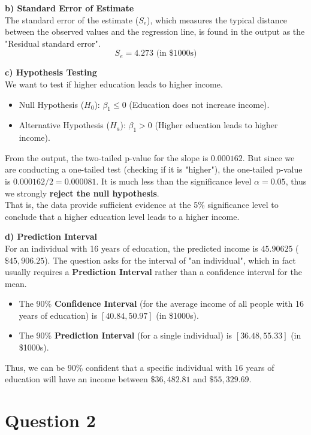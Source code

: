 \documentclass[11pt, a4paper]{article}
\begin{document}
\textbf{b) Standard Error of Estimate}\\
The standard error of the estimate ($S_e$), which measures the typical distance between the observed values and the regression line, is found in the output as the "Residual standard error". 
\[ S_e = 4.273 \text{ (in \$1000s)} \]

\textbf{c) Hypothesis Testing}\\
We want to test if higher education leads to higher income. 
\begin{itemize}
    \item Null Hypothesis ($H_0$): $\beta_1 \le 0$ (Education does not increase income).
    \item Alternative Hypothesis ($H_a$): $\beta_1 > 0$ (Higher education leads to higher income).
\end{itemize}
From the output, the two-tailed p-value for the slope is $0.000162$. But since we are conducting a one-tailed test (checking if it is "higher"), the one-tailed p-value is $0.000162 / 2 = 0.000081$. 
It is much less than the significance level $\alpha = 0.05$, thus we strongly \textbf{reject the null hypothesis}. \\
That is, the data provide sufficient evidence at the 5\% significance level to conclude that a higher education level leads to a higher income.

\textbf{d) Prediction Interval}\\
For an individual with 16 years of education, the predicted income is $45.90625$ ($\$45,906.25$). 
The question asks for the interval of "an individual", which in fact usually requires a \textbf{Prediction Interval} rather than a confidence interval for the mean. 
\begin{itemize}
    \item The 90\% \textbf{Confidence Interval} (for the average income of all people with 16 years of education) is $[40.84, 50.97]$ (in \$1000s).
    \item The 90\% \textbf{Prediction Interval} (for a single individual) is $[36.48, 55.33]$ (in \$1000s).
\end{itemize}
Thus, we can be 90\% confident that a specific individual with 16 years of education will have an income between $\$36,482.81$ and $\$55,329.69$.

\newpage

\section*{Question 2}
\end{document}
